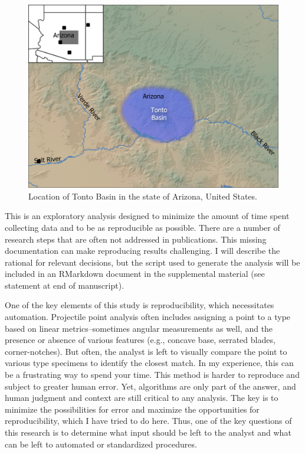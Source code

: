 \documentclass[a4paper]{article}
\begin{document}
\begin{figure}
\includegraphics[width=1\linewidth]{figures/Tonto Basin} \caption{Location of Tonto Basin in the state of Arizona, United States.}\label{fig:TontoBasinMap}
\end{figure}

This is an exploratory analysis designed to minimize the amount of time spent collecting data and to be as reproducible as possible. There are a number of research steps that are often not addressed in publications. This missing documentation can make reproducing results challenging. I will describe the rational for relevant decisions, but the script used to generate the analysis will be included in an RMarkdown document in the supplemental material (see statement at end of manuscript).

One of the key elements of this study is reproducibility, which necessitates automation. Projectile point analysis often includes assigning a point to a type based on linear metrics--sometimes angular measurements as well, and the presence or absence of various features (e.g., concave base, serrated blades, corner-notches). But often, the analyst is left to visually compare the point to various type specimens to identify the closest match. In my experience, this can be a frustrating way to spend your time. This method is harder to reproduce and subject to greater human error. Yet, algorithms are only part of the answer, and human judgment and context are still critical to any analysis. The key is to minimize the possibilities for error and maximize the opportunities for reproducibility, which I have tried to do here. Thus, one of the key questions of this research is to determine what input should be left to the analyst and what can be left to automated or standardized procedures.
\end{document}
